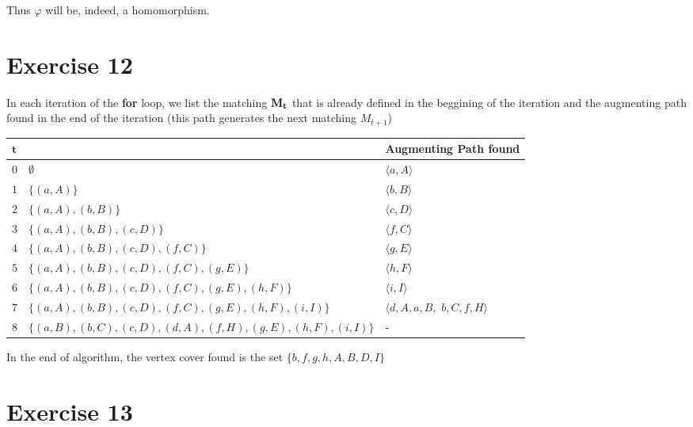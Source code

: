 \documentclass[a4paper,10pt, leqno]{article}
\def\blankpage{%
      \null%
      \clearpage}
\begin{document}
Thus $\varphi$ will be, indeed, a homomorphism.

\blankpage

\section*{Exercise 12}

In each iteration of the \textbf{for} loop, we list the matching $\bf{M_t}$ that is already defined in the beggining of the iteration and the augmenting path found in the end of the iteration (this path generates the next matching $M_{t + 1}$) 

\bgroup
\def\arraystretch{1.8}
\begin{center}
\begin{tabular}{|m{0.4cm}|m{9cm}|m{2cm}|}
\hline
\centering $\bm{t}$ & \centering{$\bm{M_t}$} & \textbf{Augmenting Path found}\\
\hline
\centering $0$ & $\emptyset$ & $\langle a, A \rangle$ \\
\hline
\centering $1$ & $\{ (a, A) \}$ & $\langle b, B \rangle$ \\
\hline
\centering $2$ & $\{ (a, A), (b, B)\}$ & $\langle c, D \rangle$ \\
\hline
\centering $3$ & $\{ (a, A), (b, B), (c, D) \}$ & $\langle f, C \rangle$ \\
\hline
\centering $4$ & $\{ (a, A), (b, B), (c, D), (f, C) \}$ & $\langle g, E \rangle$ \\
\hline
\centering $5$ & $\{ (a, A), (b, B), (c, D), (f, C), (g, E) \}$ & $\langle h, F \rangle$ \\
\hline
\centering $6$ & $\{ (a, A), (b, B), (c, D), (f, C), (g, E), (h, F) \}$ & $\langle i, I \rangle$ \\
\hline
\centering $7$ & $\{ (a, A), (b, B), (c, D), (f, C), (g, E), (h, F), (i, I) \}$ & $\langle d, A, a, B, $ \newline $ b, C, f, H \rangle$ \\
\hline
\centering $8$ & $\{ (a, B), (b, C), (c, D), (d, A), (f, H), (g, E), (h, F), (i, I) \}$ & - \\
\hline
\end{tabular}
\end{center}
\egroup

In the end of algorithm, the vertex cover found is the set $\{b, f, g, h, A, B, D, I \}$

\blankpage
\blankpage

\section*{Exercise 13}
\end{document}

